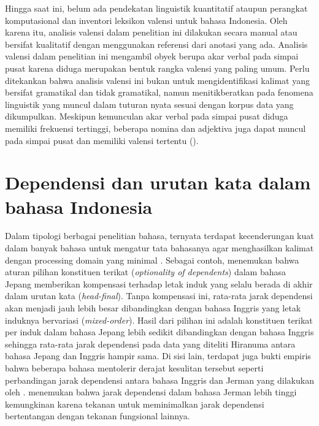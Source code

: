 Hingga saat ini, belum ada pendekatan linguistik kuantitatif ataupun perangkat komputasional dan inventori leksikon valensi untuk bahasa Indonesia. Oleh karena itu, analisis valensi dalam penelitian ini dilakukan secara manual atau bersifat kualitatif dengan menggunakan referensi dari anotasi yang ada. Analisis valensi dalam penelitian ini mengambil obyek berupa akar verbal pada simpai pusat karena diduga merupakan bentuk rangka valensi yang paling umum. Perlu ditekankan bahwa analisis valensi ini bukan untuk mengidentifikasi kalimat yang bersifat gramatikal dan tidak gramatikal, namun menitikberatkan pada fenomena linguistik yang muncul dalam tuturan nyata sesuai dengan korpus data yang dikumpulkan. Meskipun kemunculan akar verbal pada simpai pusat diduga memiliki frekuensi tertinggi, beberapa nomina dan adjektiva juga dapat muncul pada simpai pusat dan memiliki valensi tertentu (\citealp{vreznivckova2003czech, hajic2003pdt}).

\section{Dependensi dan urutan kata dalam bahasa Indonesia}
Dalam tipologi berbagai penelitian bahasa, ternyata terdapat kecenderungan kuat dalam banyak bahasa untuk mengatur tata bahasanya agar menghasilkan kalimat dengan processing domain yang minimal \citep{hawkins2001second}. Sebagai contoh, \cite{hiranuma1999syntactic} menemukan bahwa aturan pilihan konstituen terikat (\textit{optionality of dependents}) dalam bahasa Jepang memberikan kompensasi terhadap letak induk yang selalu berada di akhir dalam urutan kata (\textit{head-final}). Tanpa kompensasi ini, rata-rata jarak dependensi akan menjadi jauh lebih besar dibandingkan dengan bahasa Inggris yang letak induknya bervariasi (\textit{mixed-order}). Hasil dari pilihan ini adalah konstituen terikat per induk dalam bahasa Jepang lebih sedikit dibandingkan dengan bahasa Inggris sehingga rata-rata jarak dependensi pada data yang diteliti Hiranuma antara bahasa Jepang dan Inggris hampir sama. Di sisi lain, terdapat juga bukti empiris bahwa beberapa bahasa mentolerir derajat kesulitan tersebut seperti perbandingan jarak dependensi antara bahasa Inggris dan Jerman yang dilakukan oleh \cite{eppler2005syntax}. \cite{eppler2005syntax} menemukan bahwa jarak dependensi dalam bahasa Jerman lebih tinggi kemungkinan karena tekanan untuk meminimalkan jarak dependensi bertentangan dengan tekanan fungsional lainnya.

